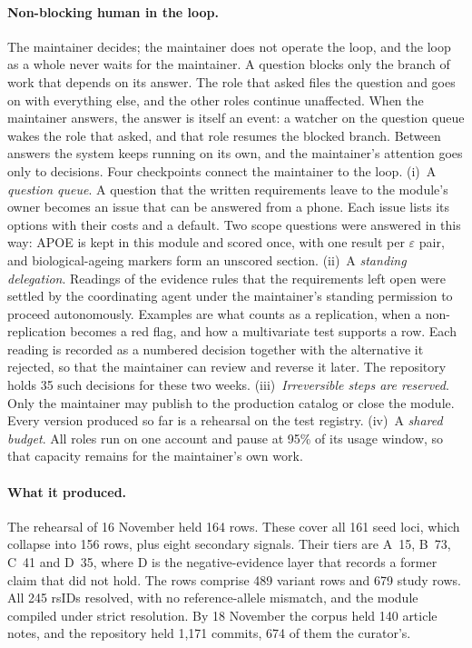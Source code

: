 \documentclass[11pt,a4paper]{article}
\begin{document}
\paragraph{Non-blocking human in the loop.} The maintainer decides; the
maintainer does not operate the loop, and the loop as a whole never waits for
the maintainer. A question blocks only the branch of work that depends on its
answer. The role that asked files the question and goes on with everything
else, and the other roles continue unaffected. When the maintainer answers,
the answer is itself an event: a watcher on the question queue wakes the role
that asked, and that role resumes the blocked branch. Between answers the
system keeps running on its own, and the maintainer's attention goes only to
decisions. Four checkpoints connect the maintainer to the loop.
(i)~A \emph{question queue}. A question that the written requirements leave
to the module's owner becomes an issue that can be answered from a phone. Each
issue lists its options with their costs and a default. Two scope questions were
answered in this way: APOE is kept in this module and scored once, with one
result per $\varepsilon$ pair, and biological-ageing markers form an unscored
section. (ii)~A \emph{standing delegation}. Readings of the evidence rules
that the requirements left open were settled by the coordinating agent under
the maintainer's standing permission to proceed autonomously. Examples are
what counts as a replication, when a non-replication becomes a red flag, and
how a multivariate test supports a row. Each reading is recorded as a numbered
decision together with the alternative it rejected, so that the maintainer can
review and reverse it later. The repository holds 35 such decisions for these
two weeks. (iii)~\emph{Irreversible steps are reserved}. Only the maintainer
may publish to the production catalog or close the module. Every version
produced so far is a rehearsal on the test registry. (iv)~A \emph{shared
budget}. All roles run on one account and pause at 95\% of its usage window,
so that capacity remains for the maintainer's own work.

\paragraph{What it produced.} The rehearsal of 16 November held 164 rows. These
cover all 161 seed loci, which collapse into 156 rows, plus eight secondary
signals. Their tiers are A~15, B~73, C~41 and D~35, where D is the
negative-evidence layer that records a former claim that did not hold. The
rows comprise 489 variant rows and 679 study rows. All 245 rsIDs resolved,
with no reference-allele mismatch, and the module compiled under strict
resolution. By 18 November the corpus held 140 article notes, and the
repository held 1,171 commits, 674 of them the curator's.
\end{document}
